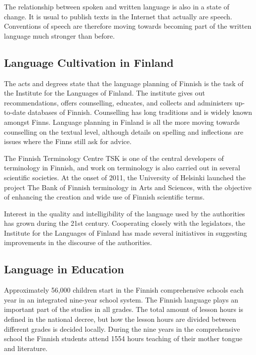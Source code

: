 \begin{multicols}{2}
      The relationship between spoken and written language is also in a state of change. It is usual to publish texts in the Internet that actually are speech.  Conventions of speech are therefore moving towards becoming part of the written language much stronger than before.

\subsection{Language Cultivation in Finland}

The acts and degrees state that the language planning of Finnish is the task of the Institute for the Languages of Finland. The institute gives out recommendations, offers counselling, educates, and collects and administers up-to-date databases of Finnish. Counselling has long traditions and is widely known amongst Finns. Language planning in Finland is all the more moving towards counselling on the textual level, although details on spelling and inflections are issues where the Finns still ask for advice.  


The Finnish Terminology Centre TSK is one of the central developers of terminology in Finnish, and work on terminology is also carried out in several scientific societies. At the onset of 2011, the University of Helsinki launched the project The Bank of Finnish terminology in Arts and Sciences, with the objective of enhancing the creation and wide use of Finnish scientific terms.

Interest in the quality and intelligibility of the language used by the authorities has grown during the 21st century. Cooperating closely with the legislators, the Institute for the Languages of Finland has made several initiatives in suggesting improvements in the discourse of the authorities.

\subsection{Language in Education}

Approximately 56,000 children start in the Finnish comprehensive schools each year in an integrated nine-year school system. The Finnish language plays an important part of the studies in all grades. The total amount of lesson hours is defined in the national decree, but how the lesson hours are divided between different grades is decided locally. During the nine years in the comprehensive school the Finnish students attend 1554 hours teaching of their mother tongue and literature.


\end{multicols}
